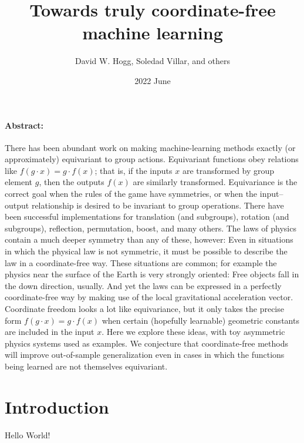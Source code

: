 \documentclass[12pt]{article}
\title{\bfseries%
  Towards truly coordinate-free\\ machine learning}
\author{%
  David W. Hogg, 
  Soledad Villar, and
  others}
\date{2022 June}
\begin{document}
\maketitle\thispagestyle{empty}

\paragraph{Abstract:}
There has been abundant work on making machine-learning methods exactly (or approximately) equivariant to group actions.
Equivariant functions obey relations like $f(g\cdot x) = g\cdot f(x)$; that is, if the inputs $x$ are transformed by group element $g$, then the outputs $f(x)$ are similarly transformed.
Equivariance is the correct goal when the rules of the game have symmetries, or when the input--output relationship is desired to be invariant to group operations.
There have been successful implementations for translation (and subgroups), rotation (and subgroups), reflection, permutation, boost, and many others.
The laws of physics contain a much deeper symmetry than any of these, however:
Even in situations in which the physical law is not symmetric, it must be possible to describe the law in a coordinate-free way.
These situations are common; for example the physics near the surface of the Earth is very strongly oriented:
Free objects fall in the down direction, usually.
And yet the laws can be expressed in a perfectly coordinate-free way by making use of the local gravitational acceleration vector.
Coordinate freedom looks a lot like equivariance, but it only takes the precise form $f(g\cdot x)=g\cdot f(x)$ when certain (hopefully learnable) geometric constants are included in the input $x$.
Here we explore these ideas, with toy asymmetric physics systems used as examples.
We conjecture that coordinate-free methods will improve out-of-sample generalization even in cases in which the functions being learned are not themselves equivariant.

\section{Introduction}

Hello World!
\end{document}
